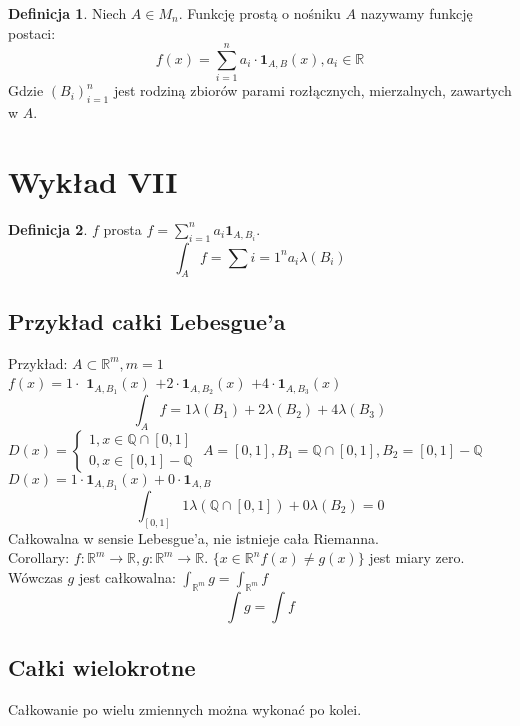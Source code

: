 \documentclass{article}
\theoremstyle{definition}
\newtheorem{de}{Definicja}[subsection]
\theoremstyle{definition}
\theoremstyle{definition}
\theoremstyle{definition}
\theoremstyle{definition}
\theoremstyle{definition}
\theoremstyle{definition}
\begin{document}
\begin{de}
    Niech $A\in M_n$. Funkcję prostą o nośniku $A$ nazywamy funkcję postaci:
    \[ f(x) = \sum_{i=1}^{n} a_i \cdot \textbf{1}_{A,B} (x), a_i\in\mathbb{R}\]
    Gdzie $(B_i)_{i=1}^{n}$ jest rodziną zbiorów parami rozłącznych, mierzalnych, zawartych w $A$.
\end{de}

\section{Wykład VII}

\begin{de}
    $f$ prosta $f=\sum_{i=1}^{n} a_i \textbf{1}_{A,B_i}$.
    \[\int_{A} f = \sum{i=1}^{n} a_i \lambda(B_i)\]
\end{de}

\subsection{Przykład całki Lebesgue'a}

Przykład:
$A\subset \mathbb{R}^m, m=1$\\
$f(x)=1 \cdot$
$\textbf{1}_{A,B_1} (x)$
$+ 2 \cdot \textbf{1}_{A,B_2} (x)$
$+ 4 \cdot \textbf{1}_{A,B_3} (x)$\\
\[\int_{A} f = 1\lambda(B_1) + 2\lambda(B_2) + 4\lambda(B_3)\]
$D(x)=\begin{cases}
    1, x\in \mathbb{Q} \cap [0,1]\\
    0, x\in [0,1] - \mathbb{Q}
\end{cases}$
$A=[0,1], B_1 = \mathbb{Q} \cap [0,1], B_2=[0,1] - \mathbb{Q}$\\
$D(x) = 1 \cdot \textbf{1}_{A,B_1} (x) + 0 \cdot \textbf{1}_{A,B}$
\[\int_{[0,1]} 1\lambda(\mathbb{Q}\cap[0,1]) + 0\lambda(B_2)=0\]
Całkowalna w sensie Lebesgue'a, nie istnieje cała Riemanna.\\
Corollary:
$f: \mathbb{R}^m \rightarrow \mathbb{R}, g: \mathbb{R}^m \rightarrow \mathbb{R}$.
$\{x\in\mathbb{R}^n f(x)\neq g(x)\}$ jest miary zero. Wówczas $g$ jest całkowalna:
$\int_{\mathbb{R}^m} g = \int_{\mathbb{R}^m} f$\\
\[\int g = \int f\]

\subsection{Całki wielokrotne}

Całkowanie po wielu zmiennych można wykonać po kolei.
\end{document}
